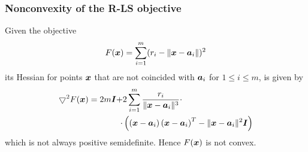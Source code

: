 
\begin{frame}
\frametitle{Nonconvexity of the R-LS objective}
\phantom{m}
\linespread{0.1} \selectfont
Given the objective
\begin{equation}
 F(\mbox{\boldmath$x$})= \sum_{i=1}^{m} (r_i - \|{\mbox{\boldmath$x$}} - {\mbox{\boldmath$a$}}_i\|)^2 \nonumber
\end{equation}
\linespread{1}\selectfont
its Hessian for points $\mbox{\boldmath$x$}$ that are not coincided with $\mbox{\boldmath$a$}_i$ for $1 \leq i \leq m$, is given by
\begin{equation}
\begin{aligned}
\nonumber
\bigtriangledown ^2 F(\mbox{\boldmath$x$})  = 2m\mbox{\boldmath$I$}  + &2\sum^m_{i=1} \frac{r_i}{\|\mbox{\boldmath$x$} - \mbox{\boldmath$a$}_i\|^3} \cdot \\
\cdot &\left( \left(\mbox{\boldmath$x$} - \mbox{\boldmath$a$}_i\right)\left(\mbox{\boldmath$x$} - \mbox{\boldmath$a$}_i\right)^T - \|\mbox{\boldmath$x$} - \mbox{\boldmath$a$}_i\|^2 \mbox{\boldmath$I$} \right)
\end{aligned}
\end{equation}
which is not always positive semidefinite. Hence $F(\mbox{\boldmath$x$})$ is not convex.
\end{frame}


